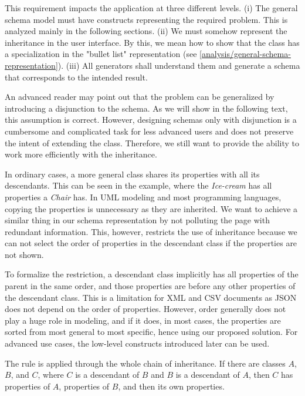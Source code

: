 This requirement impacts the application at three different levels. (i) The general schema model must have constructs representing the required problem. This is analyzed mainly in the following sections. (ii) We must somehow represent the inheritance in the user interface. By this, we mean how to show that the class has a specialization in the "bullet list" representation (see \autoref{analysis/general-schema-representation}). (iii) All generators shall understand them and generate a schema that corresponds to the intended result.

\medskip

An advanced reader may point out that the problem can be generalized by introducing a disjunction to the schema. As we will show in the following text, this assumption is correct. However, designing schemas only with disjunction is a cumbersome and complicated task for less advanced users and does not preserve the intent of extending the class. Therefore, we still want to provide the ability to work more efficiently with the inheritance.

In ordinary cases, a more general class shares its properties with all its descendants. This can be seen in the example, where the \textit{Ice-cream} has all properties a \textit{Chair} has. In UML modeling and most programming languages, copying the properties is unnecessary as they are inherited. We want to achieve a similar thing in our schema representation by not polluting the page with redundant information. This, however, restricts the use of inheritance because we can not select the order of properties in the descendant class if the properties are not shown.

To formalize the restriction, a descendant class implicitly has all properties of the parent in the same order, and those properties are before any other properties of the descendant class. This is a limitation for XML and CSV documents as JSON does not depend on the order of properties. However, order generally does not play a huge role in modeling, and if it does, in most cases, the properties are sorted from most general to most specific, hence using our proposed solution. For advanced use cases, the low-level constructs introduced later can be used.

The rule is applied through the whole chain of inheritance. If there are classes $A$, $B$, and $C$, where $C$ is a descendant of $B$ and $B$ is a descendant of $A$, then $C$ has properties of $A$, properties of $B$, and then its own properties.

